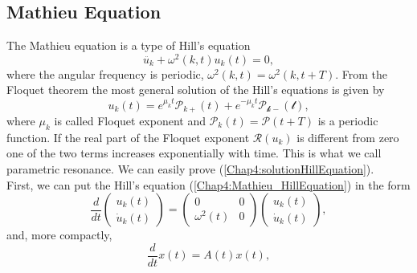 \documentclass[11pt,a4paper,twoside]{book}
\begin{document}
\subsection*{Mathieu Equation}
The Mathieu equation is a type of Hill's equation
\begin{equation}
	\label{Chap4:Mathieu_HillEquation}
	\ddot{u_{k}} + \omega^{2}(k,t)u_{k}(t) = 0,
\end{equation}
where the angular frequency is periodic, $ \omega^{2}(k,t)=\omega^{2}(k,t+T) $.
From the Floquet theorem the most general solution of the Hill's equations is given by
\begin{equation}
\label{Chap4:solutionHillEquation}
u_{k}(t) = e^{\mu_{k}t}\mathcal{P}_{k+}(t) + e^{-\mu_{k}t}\mathcal{P_{k-}(t)},
\end{equation}
where $\mu_{k}$ is called Floquet exponent and $\mathcal{P}_{k}(t)=\mathcal{P}(t+T)$ is a periodic function. If the real part of the Floquet exponent $\mathcal{R}(u_{k}) $ is different from zero one of the two terms increases exponentially with time. This is what we call parametric resonance. We can easily prove (\ref{Chap4:solutionHillEquation}).\\
First, we can put the Hill's equation (\ref{Chap4:Mathieu_HillEquation}) in the form
\begin{equation}
	\frac{d}{dt}
\left(
\begin{array}{c}
	u_{k}(t) \\
	\dot{u}_{k}(t)	
\end{array}
\right)
=
\left(
\begin{array}{cc}
	0  & 0 \\
	\omega^{2}(t) & 0
\end{array}
\right)
\left(
\begin{array}{c}
	u_{k}(t) \\
	\dot{u}_{k}(t)	
\end{array}
\right),
\end{equation}
and, more compactly,
\begin{equation}
	\label{Chap4:CompactHillEquation}
	\frac{d}{dt} x(t) = A(t) x(t),
\end{equation}
\end{document}
